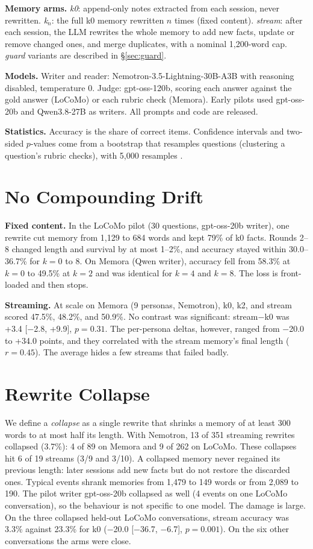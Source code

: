 \documentclass[11pt]{article}
\begin{document}
\textbf{Memory arms.} \emph{k0}: append-only notes extracted from each session, never rewritten. \emph{k}$_n$: the full k0 memory rewritten $n$ times (fixed content). \emph{stream}: after each session, the LLM rewrites the whole memory to add new facts, update or remove changed ones, and merge duplicates, with a nominal 1,200-word cap. \emph{guard} variants are described in \S\ref{sec:guard}.

\textbf{Models.} Writer and reader: Nemotron-3.5-Lightning-30B-A3B with reasoning disabled, temperature 0. Judge: gpt-oss-120b, scoring each answer against the gold answer (LoCoMo) or each rubric check (Memora). Early pilots used gpt-oss-20b and Qwen3.8-27B as writers. All prompts and code are released.

\textbf{Statistics.} Accuracy is the share of correct items. Confidence intervals and two-sided $p$-values come from a bootstrap that resamples questions (clustering a question's rubric checks), with 5,000 resamples \citep{efron1994bootstrap}.

\section{No Compounding Drift}\label{sec:drift}
\textbf{Fixed content.} In the LoCoMo pilot (30 questions, gpt-oss-20b writer), one rewrite cut memory from 1,129 to 684 words and kept 79\% of k0 facts. Rounds 2--8 changed length and survival by at most 1--2\%, and accuracy stayed within 30.0--36.7\% for $k{=}0$ to 8. On Memora (Qwen writer), accuracy fell from 58.3\% at $k{=}0$ to 49.5\% at $k{=}2$ and was identical for $k{=}4$ and $k{=}8$. The loss is front-loaded and then stops.

\textbf{Streaming.} At scale on Memora (9 personas, Nemotron), k0, k2, and stream scored 47.5\%, 48.2\%, and 50.9\%. No contrast was significant: stream$-$k0 was +3.4 [$-$2.8, +9.9], $p{=}0.31$. The per-persona deltas, however, ranged from $-$20.0 to +34.0 points, and they correlated with the stream memory's final length ($r{=}0.45$). The average hides a few streams that failed badly.

\section{Rewrite Collapse}\label{sec:collapse}
We define a \emph{collapse} as a single rewrite that shrinks a memory of at least 300 words to at most half its length. With Nemotron, 13 of 351 streaming rewrites collapsed (3.7\%): 4 of 89 on Memora and 9 of 262 on LoCoMo. These collapses hit 6 of 19 streams (3/9 and 3/10). A collapsed memory never regained its previous length: later sessions add new facts but do not restore the discarded ones. Typical events shrank memories from 1,479 to 149 words or from 2,089 to 190. The pilot writer gpt-oss-20b collapsed as well (4 events on one LoCoMo conversation), so the behaviour is not specific to one model. The damage is large. On the three collapsed held-out LoCoMo conversations, stream accuracy was 3.3\% against 23.3\% for k0 ($-$20.0 [$-$36.7, $-$6.7], $p{=}0.001$). On the six other conversations the arms were close.
\end{document}
